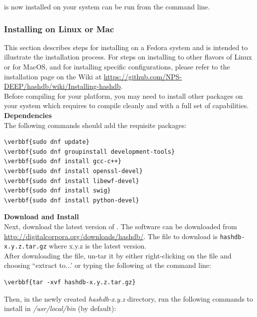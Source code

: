 \documentclass[11pt,fleqn]{article} %
\begin{document}
\hdb is now installed on your system can be run from the command line.\\

\subsubsection{Installing on Linux or Mac}
This section describes steps for installing \hdb on a Fedora system and is intended to illustrate the installation process.  For steps on installing \hdb to other flavors of Linux or for MacOS, and for installing specific configurations, please refer to the installation page on the \hdb Wiki at \url{https://github.com/NPS-DEEP/hashdb/wiki/Installing-hashdb}.\\

Before compiling \hdb for your platform, you may need to install other packages on your system which \hdb requires to compile cleanly and with a full set of capabilities.\\

\textbf{Dependencies}\\
The following commands should add the requisite packages:
\begin{Verbatim}[commandchars=\\\{\}]
\verbbf{sudo dnf update}
\verbbf{sudo dnf groupinstall development-tools}
\verbbf{sudo dnf install gcc-c++}
\verbbf{sudo dnf install openssl-devel}
\verbbf{sudo dnf install libewf-devel}
\verbbf{sudo dnf install swig}
\verbbf{sudo dnf install python-devel}
\end{Verbatim}

\textbf{Download and Install \hdb}\\
Next, download the latest version of \hdb. The software can be downloaded from \url{http://digitalcorpora.org/downloads/hashdb/}. The file to download is \texttt{hashdb-x.y.z.tar.gz} where x.y.z is the latest version.\\

After downloading the file, un-tar it by either right-clicking on the file and choosing ``extract to...' or typing the following at the command line:
\begin{Verbatim}[commandchars=\\\{\}]
\verbbf{tar -xvf hashdb-x.y.z.tar.gz}
\end{Verbatim}

Then, in the newly created \textit{hashdb-x.y.z} directory, run the following commands to install \hdb in \textit{/usr/local/bin} (by default):
\end{document}
